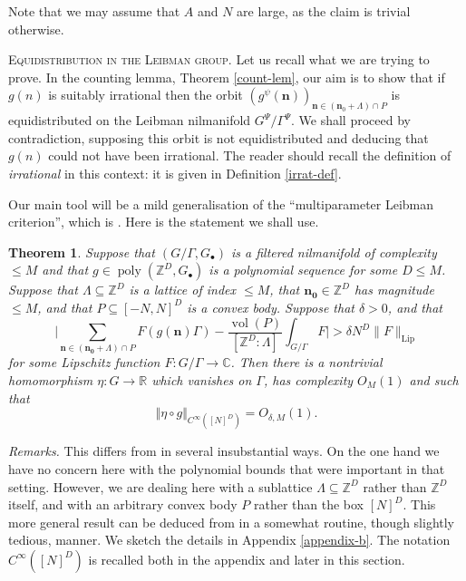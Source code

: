 \documentclass[11pt,reqno]{amsart}
\numberwithin{equation}{section}
\theoremstyle{plain}
\newtheorem{theorem}[subsection]{Theorem}
\theoremstyle{definition}
\renewcommand{\leq}{\leqslant}
\newcommand\Z{\mathbb{Z}}
\newcommand\R{\mathbb{R}}
\newcommand\C{\mathbb{C}}
\newcommand\1{{\bf 1}}
\newcommand\2{{\bf 2}}
\newcommand\poly{\operatorname{poly}}
\begin{document}
Note that we may assume that $A$ and $N$ are large, as the claim is trivial otherwise.\vspace{11pt}

\textsc{Equidistribution in the Leibman group.} Let us recall what we are trying to prove. In the counting lemma, Theorem \ref{count-lem}, our aim is to show that if $g(n)$ is suitably irrational then the orbit $(g^{\psi}(\mathbf{n}))_{\mathbf{n} \in (\mathbf{n}_0 + \Lambda) \cap P}$ is equidistributed on the Leibman nilmanifold $G^{\Psi}/\Gamma^{\Psi}$. We shall proceed by contradiction, supposing this orbit is not equidistributed and deducing that $g(n)$ could not have been irrational. The reader should recall the definition of \emph{irrational} in this context: it is given in Definition \ref{irrat-def}.

Our main tool will be a mild generalisation of the ``multiparameter Leibman criterion'', which is \cite[Theorem 8.6]{green-tao-nilratner}. Here is the statement we shall use.

\begin{theorem}\label{mpet}
Suppose that $(G/\Gamma, G_{\bullet})$ is a filtered nilmanifold of complexity $\leq M$ and that $g \in \poly(\Z^D, G_{\bullet})$ is a polynomial sequence for some $D \leq M$. Suppose that $\Lambda \subseteq \Z^D$ is a lattice of index $\leq M$, that $\mathbf{n_0} \in \Z^D$ has magnitude $\leq M$, and that $P \subseteq [-N,N]^D$ is a convex body. Suppose that $\delta > 0$, and that 
$$ \big| \sum_{{\mathbf n} \in (\mathbf{n_0}+\Lambda) \cap P} F(g({\mathbf{n}})\Gamma) - \frac{\operatorname{vol}(P)}{[\Z^D:\Lambda]} \int_{G/\Gamma} F \big| > \delta N^D \|F\|_{\operatorname{Lip}}$$
for some Lipschitz function $F: G/\Gamma \to \C$.
Then there is a nontrivial homomorphism $\eta : G \rightarrow \R$ which vanishes on $\Gamma$, has complexity $O_M(1)$ and such that 
\[ \Vert \eta \circ g \Vert_{C^{\infty}([N]^D)} = O_{\delta,M}(1).\]
\end{theorem}

\emph{Remarks.} This differs from \cite[Theorem 8.6]{green-tao-nilratner} in several insubstantial ways. On the one hand we have no concern here with the polynomial bounds that were important in that setting. However, we are dealing here with a sublattice $\Lambda \subseteq \Z^D$ rather than $\Z^D$ itself, and with an arbitrary convex body $P$ rather than the box $[N]^D$. This more general result can be deduced from \cite[Theorem 8.6]{green-tao-nilratner} in a somewhat routine, though slightly tedious, manner. We sketch the details in Appendix \ref{appendix-b}. The notation $C^{\infty}([N]^D)$ is recalled both in the appendix and later in this section.
\end{document}
